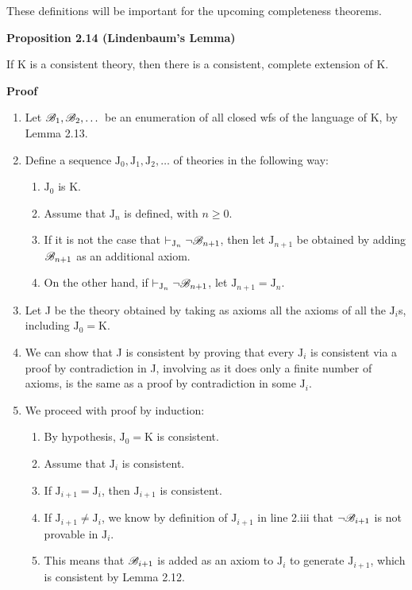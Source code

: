 These definitions will be important for the upcoming completeness theorems. 

\textbf{Proposition 2.14 (Lindenbaum's Lemma)}

If K is a consistent theory, then there is a consistent, complete extension of K.

\textbf{Proof}

\begin{enumerate}
    \item Let $\mathscr{B}_1, \mathscr{B}_2, \dots$ be an enumeration of all closed wfs of the language of K, by Lemma 2.13.
    \item Define a sequence $\text{J}_0, \text{J}_1, \text{J}_2, \dots$ of theories in the following way:
    \begin{enumerate} [label = \roman*.]
        \item $\text{J}_0$ is K.
        \item Assume that $\text{J}_n$ is defined, with $n\geq 0$.
        \item If it is not the case that $\vdash_{\text{J}_n} \lnot \mathscr{B}_{n+1}$, then let $\text{J}_{n+1}$ be obtained by adding $\mathscr{B}_{n+1}$ as an additional axiom.
        \item On the other hand, if $\vdash_{\text{J}_n} \lnot \mathscr{B}_{n+1}$, let $\text{J}_{n+1}=\text{J}_n$.
    \end{enumerate}
    \item Let J be the theory obtained by taking as axioms all the axioms of all the $\text{J}_i$s, including $\text{J}_0=\text{K}$.
    \item We can show that J is consistent by proving that every $\text{J}_i$ is consistent via a proof by contradiction in J, involving as it does only a finite number of axioms, is the same as a proof by contradiction in some $\text{J}_i$.
    \item We proceed with proof by induction:
    \begin{enumerate} [label = \roman*.]
        \item By hypothesis, $\text{J}_0=\text{K}$ is consistent.
        \item Assume that $\text{J}_i$ is consistent.
        \item If $\text{J}_{i+1}=\text{J}_i$, then $\text{J}_{i+1}$ is consistent.
        \item If $\text{J}_{i+1} \not =\text{J}_i$, we know by definition of $\text{J}_{i+1}$ in line 2.iii that $\lnot \mathscr{B}_{i+1}$ is not provable in $\text{J}_i$.
        \item This means that $\mathscr{B}_{i+1}$ is added as an axiom to $\text{J}_i$ to generate $\text{J}_{i+1}$, which is consistent by Lemma 2.12.

\end{enumerate}
\end{enumerate}
